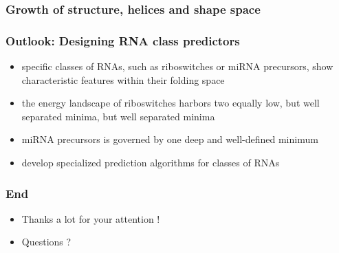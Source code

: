 \documentclass[ignorenonframetext,10pt]{beamer}
\begin{document}
\begin{frame}
\frametitle{Growth of structure, helices and shape space}
    \centering
\end{frame}

\begin{frame}
\frametitle{Outlook: Designing RNA class predictors}
    \begin{itemize} 
    \item specific classes of RNAs, such as riboswitches or miRNA precursors,
    show characteristic features within their folding space
    \item the energy landscape of riboswitches harbors two equally low, but well
    separated minima, but well separated minima
    \item miRNA precursors is governed by one deep and well-defined minimum
    \item develop specialized prediction algorithms for classes of RNAs
    \end{itemize}
\end{frame}

\begin{frame}
\frametitle{End}
   \begin{itemize} 
   \item Thanks a lot for your attention !
   \item Questions ?
   \end{itemize}
\end{frame}
\end{document}
